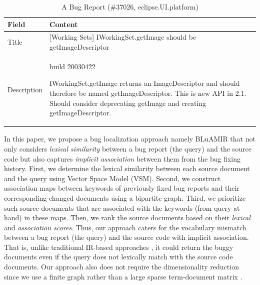 \documentclass[conference]{IEEEtran}
\begin{document}
\begin{table}[!tb]
	\caption{A Bug Report (\#37026, eclipse.UI.platform)}
	\label{tab:BugInfo}
	\vspace{-.4cm}
	\begin{center}
		\begin{tabular}{ p{1.5cm} | p{6cm}}
			\hline
			\textbf{Field}  & \textbf{Content} \\
			\hline
			\hline
			Title & [Working Sets] IWorkingSet.getImage should be getImageDescriptor
			\\
			\hline
			Description &  
		build 20030422
		
		IWorkingSet.getImage returns an ImageDescriptor and should therefore be named 
		getImageDescriptor.
		This is new API in 2.1. Should consider deprecating getImage and creating 
		getImageDescriptor.\\
			\hline
		\end{tabular}
	\end{center}
\end{table}


In this paper, we propose a bug localization approach namely BLuAMIR that not only considers \emph{lexical similarity} between a bug report (the query) and the source code but also captures \emph{implicit association} between them from the bug fixing history. First, we determine the lexical similarity between each source document and the query using Vector Space Model (VSM).
Second, we construct association maps between keywords of previously fixed bug reports and their corresponding changed documents using a bipartite graph. Third, we prioritize such source documents that are associated with the keywords (from query at hand) in these maps. Then, we rank the source documents based on their \emph{lexical} and \emph{association scores}.
Thus, our approach caters for the vocabulary mismatch between a bug report (the query) and the source code with implicit association. 
That is, unlike traditional IR-based approaches \cite{Jian,Saha}, it could return the buggy documents even if the query does not lexically match with the source code documents. Our approach also does not require the dimensionality reduction since we use a finite graph rather than a large sparse term-document matrix \cite{MarcusLSI,MarcusMaletic}.
\end{document}
